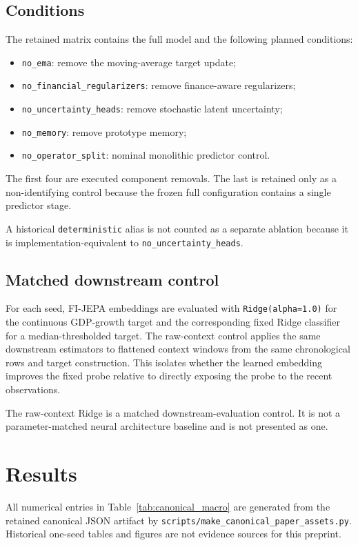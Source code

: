 \documentclass[11pt]{article}
\begin{document}
\subsection{Conditions}
The retained matrix contains the full model and the following planned conditions:
\begin{itemize}[leftmargin=1.5em]
    \item \texttt{no\_ema}: remove the moving-average target update;
    \item \texttt{no\_financial\_regularizers}: remove finance-aware regularizers;
    \item \texttt{no\_uncertainty\_heads}: remove stochastic latent uncertainty;
    \item \texttt{no\_memory}: remove prototype memory;
    \item \texttt{no\_operator\_split}: nominal monolithic predictor control.
\end{itemize}
The first four are executed component removals. The last is retained only as a non-identifying control because the frozen full configuration contains a single predictor stage.

A historical \texttt{deterministic} alias is not counted as a separate ablation because it is implementation-equivalent to \texttt{no\_uncertainty\_heads}.

\subsection{Matched downstream control}
For each seed, FI-JEPA embeddings are evaluated with \texttt{Ridge(alpha=1.0)} for the continuous GDP-growth target and the corresponding fixed Ridge classifier for a median-thresholded target. The raw-context control applies the same downstream estimators to flattened context windows from the same chronological rows and target construction. This isolates whether the learned embedding improves the fixed probe relative to directly exposing the probe to the recent observations.

The raw-context Ridge is a matched downstream-evaluation control. It is not a parameter-matched neural architecture baseline and is not presented as one.

\section{Results}
All numerical entries in Table~\ref{tab:canonical_macro} are generated from the retained canonical JSON artifact by \texttt{scripts/make\_canonical\_paper\_assets.py}. Historical one-seed tables and figures are not evidence sources for this preprint.
\end{document}
